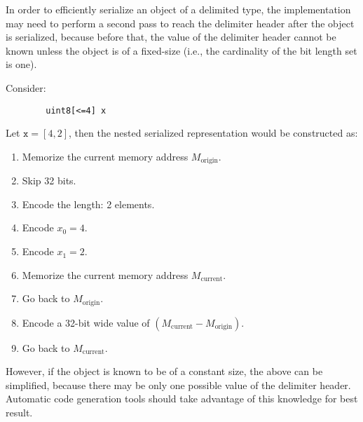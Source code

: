 \begin{remark}
    In order to efficiently serialize an object of a delimited type,
    the implementation may need to perform a second pass to reach the delimiter header
    after the object is serialized, because before that, the value of the delimiter header cannot be known
    unless the object is of a fixed-size (i.e., the cardinality of the bit length set is one).

    Consider:
    \begin{verbatim}
        uint8[<=4] x
    \end{verbatim}
    Let $\texttt{x} = \left[ 4, 2 \right]$,
    then the nested serialized representation would be constructed as:
    \begin{enumerate}
        \item Memorize the current memory address $M_\text{origin}$.
        \item Skip 32 bits.
        \item Encode the length: 2 elements.
        \item Encode $x_0 = 4$.
        \item Encode $x_1 = 2$.
        \item Memorize the current memory address $M_\text{current}$.
        \item Go back to $M_\text{origin}$.
        \item Encode a 32-bit wide value of $(M_\text{current} - M_\text{origin})$.
        \item Go back to $M_\text{current}$.
    \end{enumerate}

    However, if the object is known to be of a constant size, the above can be simplified,
    because there may be only one possible value of the delimiter header.
    Automatic code generation tools should take advantage of this knowledge for best result.
\end{remark}

